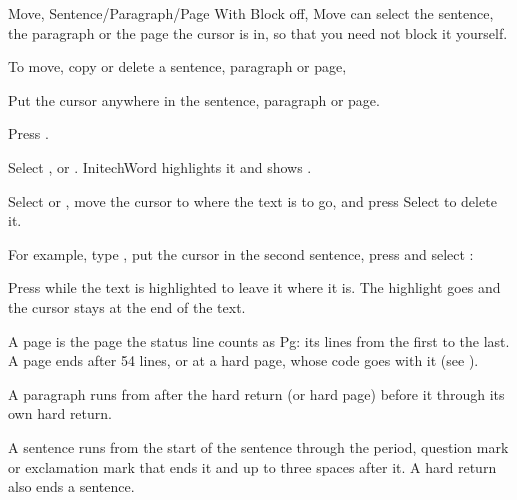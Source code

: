 \begin{Feature}{Move, Sentence/Paragraph/Page}
With Block off, Move can select the sentence, the paragraph or the page the
cursor is in, so that you need not block it yourself.

To move, copy or delete a sentence, paragraph or page,
\begin{WPSteps}
\item Put the cursor anywhere in the sentence, paragraph or page.
\item Press .
\item Select ,  or .
InitechWord highlights it and shows .
\item Select  or , move the cursor to where the
text is to go, and press 
\Or
Select  to delete it.
\end{WPSteps}

For example, type
,
put the cursor in the second sentence,
press  and select :
\EndReplay

\Notes
{}
Press  while the text is highlighted to leave it where it is.
The highlight goes and the cursor stays at the end of the text.

A page is the page the status line counts as Pg: its lines from the first
to the last.  A page ends after 54 lines, or at a hard page, whose code goes
with it (see ).

A paragraph runs from after the hard return (or hard page) before it
through its own hard return.

A sentence runs from the start of the sentence through the period,
question mark or exclamation mark that ends it and up to three spaces after
it.  A hard return also ends a sentence.

\end{Feature}
